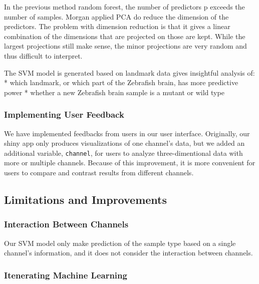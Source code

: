 \documentclass[10pt,letterpaper]{article}
\begin{document}
In the previous method random forest, the number of predictors p exceeds
the number of samples. Morgan applied PCA do reduce the dimension of the
predictors. The problem with dimension reduction is that it gives a
linear combination of the dimensions that are projected on those are
kept. While the largest projections still make sense, the minor
projections are very random and thus difficult to interpret.

The SVM model is generated based on landmark data gives insightful
analysis of: * which landmark, or which part of the Zebrafish brain, has
more predictive power * whether a new Zebrafish brain sample is a mutant
or wild type

\subsubsection{Implementing User
Feedback}\label{implementing-user-feedback}

We have implemented feedbacks from users in our user interface.
Originally, our shiny app only produces visualizations of one channel's
data, but we added an additional variable, \texttt{channel}, for users
to analyze three-dimentional data with more or multiple channels.
Because of this improvement, it is more convenient for users to compare
and contrast results from different channels.

\subsection{Limitations and
Improvements}\label{limitations-and-improvements}

\subsubsection{Interaction Between
Channels}\label{interaction-between-channels}

Our SVM model only make prediction of the sample type based on a single
channel's information, and it does not consider the interaction between
channels.

\subsubsection{Itenerating Machine
Learning}\label{itenerating-machine-learning}
\end{document}

